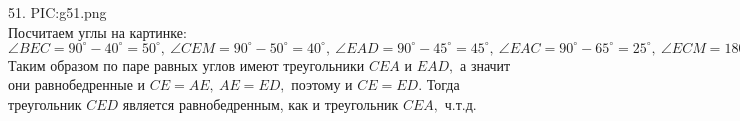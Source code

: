 51. {{PIC:g51.png}}\\
Посчитаем углы на картинке: $\angle BEC=90^\circ-40^\circ=50^\circ,\ \angle CEM=90^\circ-50^\circ=40^\circ,\ \angle EAD=90^\circ-45^\circ=45^\circ,\ \angle EAC=90^\circ-65^\circ=25^\circ,\ \angle ECM=180^\circ-90^\circ-40^\circ-25^\circ=25^\circ.$ Таким образом по паре равных углов имеют треугольники $CEA$ и $EAD,$ а значит они равнобедренные и $CE=AE,\ AE=ED,$ поэтому и $CE=ED.$ Тогда треугольник $CED$ является равнобедренным, как и треугольник $CEA,$ ч.т.д.\\
